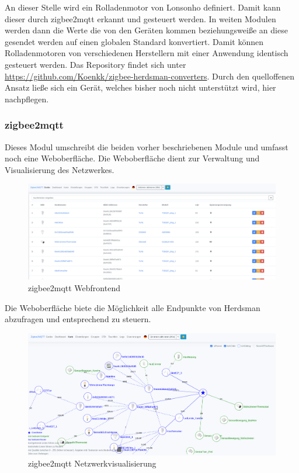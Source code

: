   An dieser Stelle wird ein Rolladenmotor von Lonsonho definiert. Damit kann dieser durch zigbee2mqtt erkannt und gesteuert werden. In weiten Modulen werden dann die Werte die von den Geräten kommen
  beziehungsweiße an diese gesendet werden auf einen globalen Standard konvertiert. Damit können Rolladenmotoren von verschiedenen Herstellern mit einer Anwendung identisch gesteuert werden. Das 
  Repository findet sich unter \url{https://github.com/Koenkk/zigbee-herdsman-converters}. Durch den quelloffenen Ansatz ließe sich ein Gerät, welches bisher noch nicht unterstützt wird, hier nachpflegen.

\subsubsection{zigbee2mqtt}

Dieses Modul umschreibt die beiden vorher beschriebenen Module und umfasst noch eine Weboberfläche. Die Weboberfläche dient zur Verwaltung und Visualisierung des Netzwerkes.
\begin{figure}[H]
  \centering
  \includegraphics[width=1\textwidth]{media/z2m.png}
  \caption{zigbee2mqtt Webfrontend}
\end{figure}

Die Weboberfläche biete die Möglichkeit alle Endpunkte von Herdsman abzufragen und entsprechend zu steuern.

\begin{figure}[H]
  \centering
  \includegraphics[width=1\textwidth]{media/z2m-map.png}
  \caption{zigbee2mqtt Netzwerkvisualisierung}
\end{figure}

